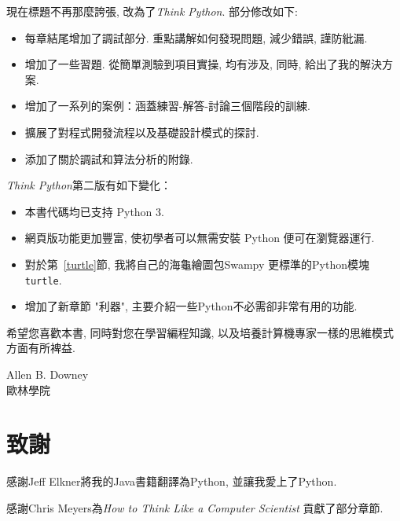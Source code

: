 \documentclass[10pt]{book}
\begin{document}
現在標題不再那麼誇張, 改為了{\em Think Python}. 
部分修改如下:

\begin{itemize}

\item 每章結尾增加了調試部分. 
重點講解如何發現問題, 減少錯誤, 謹防紕漏. 

\item 增加了一些習題. 從簡單測驗到項目實操, 
均有涉及, 同時, 給出了我的解決方案. 

\item 增加了一系列的案例：涵蓋練習-解答-討論三個階段的訓練. 

\item 擴展了對程式開發流程以及基礎設計模式的探討. 

\item 添加了關於調試和算法分析的附錄. 

\end{itemize}

{\em Think Python}第二版有如下變化：

\begin{itemize}

\item 本書代碼均已支持 Python 3.

\item 網頁版功能更加豐富, 使初學者可以無需安裝 Python 便可在瀏覽器運行. 

\item 對於第~\ref{turtle}節, 我將自己的海龜繪圖包Swampy 更標準的Python模塊{\tt turtle}. 

\item 增加了新章節 "利器", 主要介紹一些Python不必需卻非常有用的功能. 

\end{itemize}

希望您喜歡本書, 同時對您在學習編程知識, 以及培養計算機專家一樣的思維模式
方面有所裨益. 



Allen B. Downey \\

歐林學院 \\


\section*{致謝}

感謝Jeff Elkner將我的Java書籍翻譯為Python, 
並讓我愛上了Python.

感謝Chris Meyers為{\em How to Think Like a Computer Scientist}
貢獻了部分章節. 
\end{document}

